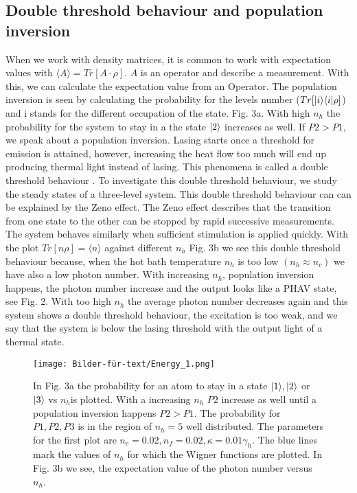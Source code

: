 \documentclass[12pt,a4paper]{article}
\DeclarePairedDelimiter\bra{\langle}{\rvert}
\DeclarePairedDelimiter\ket{\lvert}{\rangle}
\begin{document}


\newpage
\subsection{Double threshold behaviour and population inversion}
 When we work with density matrices, it is common to work with expectation values with $\langle A \rangle=Tr[A\cdot\rho]$.
 $A$ is an operator and describe a measurement.
With this, we can calculate the expectation value from an Operator. 
The population inversion is seen by calculating the probability for the levels number ($Tr[\ket{i}\bra{i} \rho]$) and i stands for the different occupation of the state. Fig. 3a.  With high $n_h$ the probability for the system to stay in a the state $\ket{2}$ increases as well. If $P2>P1$, we speak about a population inversion.  
Lasing starts once a threshold for emission is attained, however, increasing the heat flow too much will end up producing  thermal light instead of lasing. This phenomena is called a double threshold behaviour \cite{Li2017}. To investigate this double threshold behaviour, we study the steady states of a three-level system.
This double threshold behaviour can can be explained by the Zeno effect. 
The Zeno effect describes that the transition from one state to the other can be stopped by rapid successive measurements. 
The system behaves similarly when sufficient stimulation is applied quickly. 
With the plot  $Tr[n\rho] =\langle n\rangle$ against different $n_h$ Fig. 3b we see this double threshold behaviour because, when the hot bath temperature $n_h$ is too low $(n_h \approx n_c)$ we have also a  low photon number. With increasing $n_h$, population inversion happens, the photon number increase and the output looks like a PHAV state,  see  Fig. 2. With too high $n_h$ the average photon number decreases again and this system shows a double threshold behaviour, the excitation is too weak, and we say that the system is below the lasing threshold with the output light of a thermal state.
\begin{figure}[h!]
\hspace{-1cm}
\texttt{[image: Bilder-für-text/Energy\_1.png]}
\caption{In Fig. 3a the probability for an atom to stay in a state $\ket{1}, \ket{2}$ or $\ket{3}$ vs $n_h$is plotted. With a increasing $n_h$ $P2$ increase as well until a population inversion happens $P2>P1$. The probability for $P1,P2,P3$ is in the region of $n_h=5 $ well distributed. The parameters for the first plot are $n_c=0.02 ,n_f=0.02,\kappa=0.01\gamma_h $. The blue lines mark the values of $ n_h$ for which the Wigner functions are plotted. In Fig. 3b we see, the expectation value of the photon number versus $n_h$.}
\end{figure}
\end{document}
